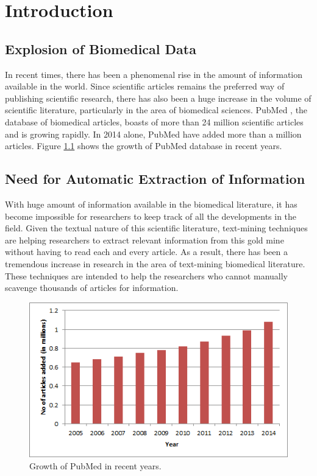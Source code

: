 \chapter{Introduction}\label{chapter:introduction}

\section{Explosion of Biomedical Data}

In recent times, there has been a phenomenal rise in the amount of information available in the world. Since scientific articles remains the preferred way of publishing scientific research, there has also been a huge increase in the volume of scientific literature, particularly in the area of biomedical sciences. PubMed \cite{pubmed}, the database of biomedical articles, boasts of more than 24 million scientific articles and is growing rapidly. In 2014 alone, PubMed have added more than a million articles. Figure \ref{fig:PubMedTimeLine} shows the growth of PubMed database in recent years.

\section{Need for Automatic Extraction of Information}

With huge amount of information available in the biomedical literature, it has become impossible for researchers to keep track of all the developments in the field. Given the textual nature of this scientific literature, text-mining techniques are helping researchers to extract relevant information from this gold mine without having to read each and every article. As a result, there has been a tremendous increase in research in the area of text-mining biomedical literature. These techniques are intended to help the researchers who cannot manually scavenge thousands of articles for information.

\begin{figure}
\centering
\includegraphics[scale=1]{figures/PubMedTimeLine.png}
\caption{Growth of PubMed in recent years.}\label{fig:PubMedTimeLine}
\end{figure}

